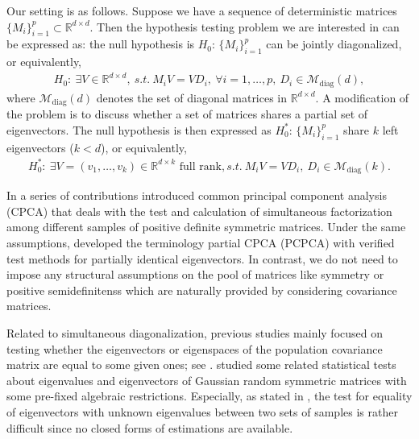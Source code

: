 \documentclass[12pt]{article}
\numberwithin{thm}{section}
\numberwithin{defn}{section}
\numberwithin{lem}{section}
\numberwithin{prop}{section}
\numberwithin{cor}{section}
\numberwithin{rem}{section}
\DeclareMathOperator{\diag}{diag}
\begin{document}
Our setting is as follows.
Suppose we have a sequence of deterministic matrices $\{M_i\}_{i = 1}^p \subset \mathbb{R}^{d \times d}$. Then the hypothesis testing problem we are interested in can be expressed as: the null hypothesis is $H_0$: $\{M_i\}_{i = 1}^p$ can be jointly diagonalized, or equivalently, 
\begin{multline}\label{hyp:all}
    H_0: ~ \exists V \in \mathbb{R}^{d \times d}, ~ s.t. ~ M_i V = V D_i,\
    \forall i = 1, \dots, p, ~ D_i \in \mathcal{M}_{\diag}(d),
\end{multline}
where $\mathcal{M}_{\diag}(d)$ denotes the set of diagonal matrices in $\mathbb{R}^{d \times d}$.
A modification of the problem is to discuss whether a set of matrices shares a partial set of eigenvectors. The null hypothesis is then expressed as $H_0^*$: $\{M_i\}_{i = 1}^p$ share $k$ left eigenvectors ($k<d$), or equivalently, 
\begin{multline} \label{hyp:part}
    H_0^*: ~ \exists V = (v_1, \dots, v_k) \in \mathbb{R}^{d \times k} \text{ full rank}, s.t. ~ M_i V = V D_i, ~ D_i \in \mathcal{M}_{\diag}(k).
\end{multline}

In a series of contributions \cite{Flury84,FluryAsymptotic,Flury86} introduced common principal component analysis (CPCA) that deals with the test and calculation of simultaneous factorization among different samples of positive definite symmetric matrices. 
Under the same assumptions, \cite{schott} developed the terminology partial CPCA (PCPCA) with verified test methods for partially identical eigenvectors. 
In contrast, we do not need to impose any structural assumptions on the pool of matrices like symmetry or positive semidefinitenss which are naturally provided by considering covariance matrices.

Related to simultaneous diagonalization, previous studies mainly focused on testing whether the eigenvectors or eigenspaces of the population covariance matrix are equal to some given ones; see \cite{tyler,koltchinskii2017new,silin2018bayesian,naumov2019bootstrap,silin2020hypothesis}. \cite{Schwartz} studied some related statistical tests about eigenvalues and eigenvectors of Gaussian random symmetric matrices with some pre-fixed algebraic restrictions.
Especially, as stated in \cite{Schwartz}, the test for equality of eigenvectors with unknown eigenvalues between two sets of samples is rather difficult since no closed forms of estimations are available.
\end{document}
